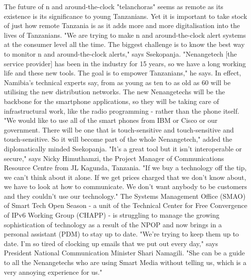 \documentclass{article}%
\begin{document}
The future of n and around{-}the{-}clock "telanchoras" seems as remote as its existence is its significance to young Tanzanians. Yet it is important to take stock of just how remote Tanzania is as it adds more and more digitalisation into the lives of Tanzanians.\newline%
"We are trying to make n and around{-}the{-}clock alert systems at the consumer level all the time. The biggest challenge is to know the best way to monitor n and around{-}the{-}clock alerts," says Ssekopanja.\newline%
"Nenangetech {[}the service provider{]} has been in the industry for 15 years, so we have a long working life and these new tools. The goal is to empower Tanzanians," he says.\newline%
In effect, Namibia's technical experts say, from as young as ten to as old as 60 will be utilising the new distribution networks.\newline%
The new Nenangetechs will be the backbone for the smartphone applications, so they will be taking care of infrastructural work, like the radio programming {-} rather than the phone itself.\newline%
"We would like to use all of the smart phones from IBM or Cisco or our government. There will be one that is touch{-}sensitive and touch{-}sensitive and touch{-}sensitive. So it will become part of the whole Nenangetech," added the diplomatically minded Ssekopanja.\newline%
"It's a great tool but it isn't interoperable or secure," says Nicky Himuthamzi, the Project Manager of Communications Resource Centre from JL Kagunda, Tanzania.\newline%
"If we buy a technology off the tip, we can't think about it alone. If we get prices charged that we don't know about, we have to look at how to communicate. We don't want anybody to be customers and they couldn't use our technology."\newline%
The Systems Management Office (SMAO) of Smart Tech Open Season {-} a unit of the Technical Center for Free Convergence of IPv6 Working Group (CHAPP) {-} is struggling to manage the growing sophistication of technology as a result of the NPOP and now brings in a personal assistant (PDM) to stay up to date.\newline%
"We're trying to keep them up to date. I'm so tired of clocking up emails that we put out every day," says President National Communication Minister Shari Namagili.\newline%
"She can be a guide to all the Nenangetechs who are using Smart Media without telling us, which is a very annoying experience for us."\newline%
\end{document}
